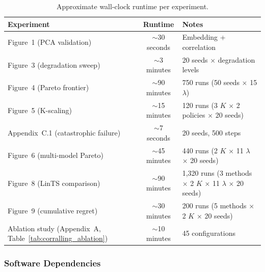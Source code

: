 \begin{table}[h]
\centering
\caption{Approximate wall-clock runtime per experiment.}
\label{tab:runtimes}
\small
\begin{tabular}{@{}lcl@{}}
\toprule
\textbf{Experiment} & \textbf{Runtime} & \textbf{Notes} \\
\midrule
Figure~1 (PCA validation) & $\sim$30 seconds & Embedding + correlation \\
Figure~3 (degradation sweep) & $\sim$3 minutes & 20 seeds $\times$ degradation levels \\
Figure~4 (Pareto frontier) & $\sim$90 minutes & 750 runs (50 seeds $\times$ 15 $\lambda$) \\
Figure~5 (K-scaling) & $\sim$15 minutes & 120 runs (3 $K$ $\times$ 2 policies $\times$ 20 seeds) \\
Appendix~C.1 (catastrophic failure) & $\sim$7 seconds & 20 seeds, 500 steps \\
Figure~6 (multi-model Pareto) & $\sim$45 minutes & 440 runs (2 $K$ $\times$ 11 $\lambda$ $\times$ 20 seeds) \\
Figure~8 (LinTS comparison) & $\sim$90 minutes & 1,320 runs (3 methods $\times$ 2 $K$ $\times$ 11 $\lambda$ $\times$ 20 seeds) \\
Figure~9 (cumulative regret) & $\sim$30 minutes & 200 runs (5 methods $\times$ 2 $K$ $\times$ 20 seeds) \\
Ablation study (Appendix~A, Table~\ref{tab:corralling_ablation}) & $\sim$10 minutes & 45 configurations \\
\bottomrule
\end{tabular}
\end{table}

\subsubsection{Software Dependencies}

